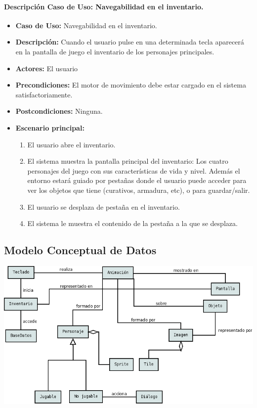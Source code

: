 \documentclass[a4paper,10pt]{article}
\begin{document}
\paragraph*{Descripción Caso de Uso: Navegabilidad en el inventario.}
\begin{itemize}
\item \textbf{Caso de Uso:} Navegabilidad en el inventario.
\item \textbf{Descripción:} Cuando el usuario pulse en una determinada tecla
  aparecerá en la pantalla de juego el inventario de los personajes principales.
\item \textbf{Actores:} El usuario
\item \textbf{Precondiciones:} El motor de movimiento debe estar cargado en el
  sistema satisfactoriamente.
\item \textbf{Postcondiciones:} Ninguna.
\item \textbf{Escenario principal:} \\
\begin{enumerate}
\item El usuario abre el inventario.
\item El sistema muestra la pantalla principal del inventario: Los cuatro
  personajes del juego con sus características de vida y nivel. Además el
  entorno estará guiado por pestañas donde el usuario puede acceder para ver los
  objetos que tiene (curativos, armadura, etc), o para guardar/salir.
\item El usuario se desplaza de pestaña en el inventario.
\item El sistema le muestra el contenido de la pestaña a la que se desplaza.
\end{enumerate}
\end{itemize}


\subsection{Modelo Conceptual de Datos}

\includegraphics[scale=0.6]{Diagrama_conceptual.png}
\end{document}
